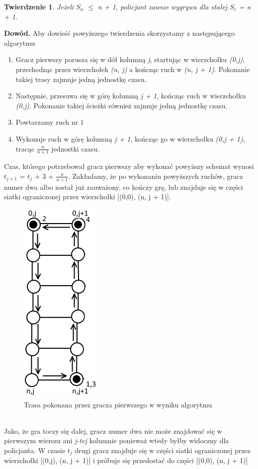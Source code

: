 \documentclass[brudnopis]{xmgr}
\newtheorem{Twierdzenie}{Twierdzenie}
\begin{document}
\begin{Twierdzenie}
	Jeżeli $S_n$ $\le$ n + 1, policjant zawsze wygrywa dla stałej $S_c$ = n + 1.
\end{Twierdzenie}
\textbf{Dowód.} Aby dowieść powyższego twierdzenia skorzystamy z następującego algorytmu
\begin{enumerate}
	\item Gracz pierwszy porusza się w dół kolumną \textit{j}, startując w wierzchołku \textit{(0,j)}, przechodząc przez wierzchołek \textit{(n, j)} a kończąc ruch w \textit{(n, j + 1)}. Pokonanie takiej trasy zajmuje jedną jednostkę czasu.
	\item Następnie, przesuwa się w górę kolumną \textit{j + 1}, kończąc ruch w wierzchołku \textit{(0,j)}. Pokonanie takiej ścieżki również zajmuje jedną jednostkę czasu.
	\item Powtarzamy ruch nr 1
	\item Wykonuje ruch w górę kolumną \textit{j + 1}, kończąc go w wierzchołku \textit{(0,j + 1)}, tracąc $\frac{n}{n+1}$ jednostki czasu.
\end{enumerate}

Czas, którego potrzebował gracz pierwszy aby wykonać powyższy schemat wynosi $t_{j+1}$ = $t_j$ + 3 + $\frac{n}{n+1}$.
Zakładamy, że po wykonaniu powyższych ruchów, gracz numer dwa albo został już zauważony, co kończy grę, lub znajduje się w części siatki ograniczonej przez wierzchołki [(0,0), (n, j + 1)].
\begin{figure}[ht!]
  \centering
  \includegraphics{rysunki/schemat_ruchu.png}
  \caption{Trasa pokonana przez gracza pierwszego w wyniku algorytmu}
\end{figure} 
\\\indent Jako, że gra toczy się dalej, gracz numer dwa nie może znajdować się w pierwszym wierszu ani \textit{j-tej} kolumnie ponieważ wtedy byłby widoczny dla policjanta. W czasie \textit{$t_j$} drugi gracz znajduje się w części siatki ograniczonej przez wierzchołki [(0,j), (n, j + 1)] i próbuje się przedostać do części [(0,0), (n, j + 1)]
\end{document}
